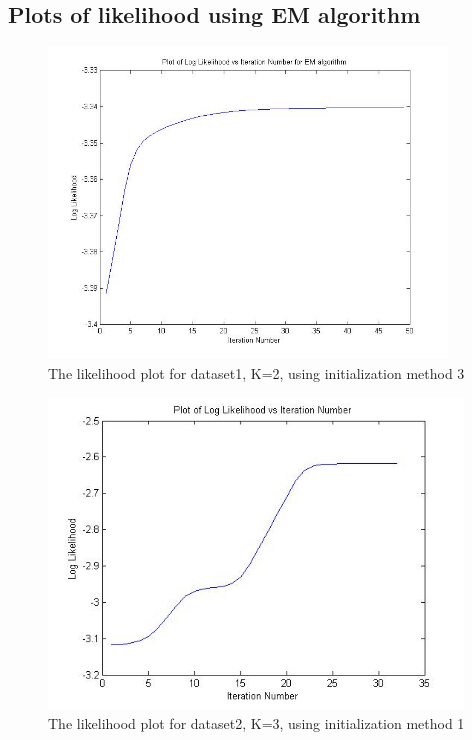 \documentclass[11pt,psfig]{article}
\begin{document}
\subsection*{Plots of likelihood using EM algorithm}

\begin{figure}[H]
\centering
\includegraphics[height=3.25in]{dataset1_EMlogLikelihoodPlot.jpg}
\caption{The likelihood plot for dataset1, K=2, using initialization method 3}
\end{figure}

\begin{figure}[H]
\centering
\includegraphics[height=3.25in]{dataset2_EMlogLikelihoodPlot.jpg}
\caption{The likelihood plot for dataset2, K=3, using initialization method 1}
\end{figure}
\end{document}

